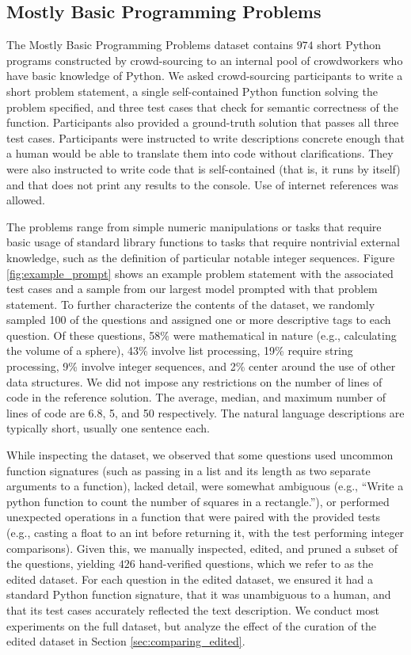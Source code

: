 \subsection{Mostly Basic Programming Problems}
\label{sec:datasets:mbpp}

The Mostly Basic Programming Problems dataset contains $974$ short Python programs constructed by crowd-sourcing to an internal  pool of crowdworkers who have basic knowledge of Python. We asked crowd-sourcing participants to write a short problem statement, a single self-contained Python function solving the problem specified, and three test cases that check for semantic correctness of the function. Participants also provided a ground-truth solution that passes all three test cases. Participants were instructed to write descriptions concrete enough that a human would be able to translate them into code without clarifications. They were also instructed to write code that is self-contained (that is, it runs by itself) and that does not print any results to the console. Use of internet references was allowed.

The problems range from simple numeric manipulations or tasks that require basic usage of standard library functions to tasks that require nontrivial external knowledge, such as the definition of particular notable integer sequences. Figure \ref{fig:example_prompt} shows an example problem statement with the associated test cases and a sample from our largest model prompted with that problem statement. To further characterize the contents of the dataset, we randomly sampled 100 of the questions and assigned one or more descriptive tags to each question. Of these questions, 58\% were mathematical in nature (e.g., calculating the volume of a sphere), 43\% involve list processing, 19\% require string processing, 9\% involve integer sequences, and 2\% center around the use of other data structures. We did not impose any restrictions on the number of lines of code in the reference solution. The average, median, and maximum number of lines of code are 6.8, 5, and 50 respectively. The natural language descriptions are typically short, usually one sentence each.

While inspecting the dataset, we observed that some questions used uncommon function signatures (such as passing in a list and its length as two separate arguments to a function), lacked detail, were somewhat ambiguous (e.g., ``Write a python function to count the number of squares in a rectangle.''), or performed unexpected operations in a function that were paired with the provided tests (e.g., casting a float to an int before returning it, with the test performing integer comparisons). Given this, we manually inspected, edited, and pruned a subset of the questions, yielding $426$ hand-verified questions, which we refer to as the {edited dataset}. For each question in the edited dataset, we ensured it had a standard Python function signature, that it was unambiguous to a human, and that its test cases accurately reflected the text description. We conduct most experiments on the full dataset, but analyze the effect of the curation of the edited dataset in Section \ref{sec:comparing_edited}.

